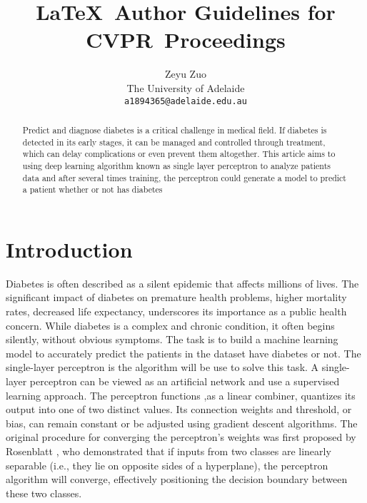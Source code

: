 \documentclass[10pt,twocolumn,letterpaper]{article}
\def\confName{CVPR}
\begin{document}
\title{\LaTeX\ Author Guidelines for \confName~Proceedings}

\author{Zeyu Zuo\\
The University of Adelaide\\
{\tt\small a1894365@adelaide.edu.au}
}
\maketitle

\begin{abstract}
Predict and diagnose diabetes is a critical challenge in medical field. If diabetes is detected in its early stages, it can be managed and controlled through treatment, which can delay complications or even prevent them altogether. This article aims to using deep learning algorithm known as single layer perceptron to analyze patients data and after several times training, the perceptron could generate a model to predict a patient whether or not has diabetes
\end{abstract}

\section{Introduction}
\label{sec:intro}
Diabetes is often described as a silent epidemic that affects millions of lives. The significant impact of diabetes on premature health problems, higher mortality rates, decreased life expectancy, underscores its importance as a public health concern. While diabetes is a complex and chronic condition, it often begins silently, without obvious symptoms.  The task is to build a machine learning model to accurately predict the patients in the dataset have diabetes or not. The single-layer perceptron is the algorithm will be use to solve this task. A single-layer perceptron can be viewed as an artificial network and use a supervised learning approach. The perceptron functions ,as a linear combiner, quantizes its output into one of two distinct values. Its connection weights and threshold, or bias, can remain constant or be adjusted using gradient descent algorithms. The original procedure for converging the perceptron's weights was first proposed by Rosenblatt \cite{rosenblatt1958perceptron} , who demonstrated that if inputs from two classes are linearly separable (i.e., they lie on opposite sides of a hyperplane), the perceptron algorithm will converge, effectively positioning the decision boundary between these two classes.
\end{document}
